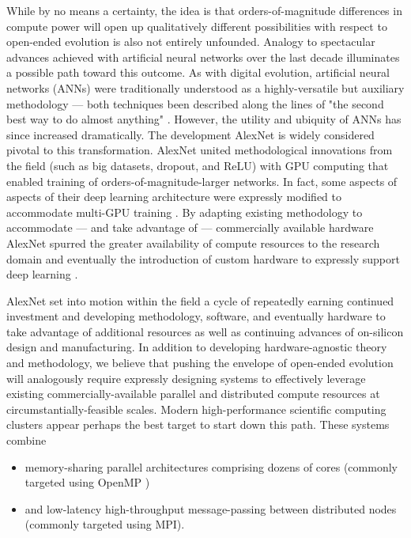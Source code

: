 While by no means a certainty, the idea is that orders-of-magnitude differences in compute power will open up qualitatively different possibilities with respect to open-ended evolution is also not entirely unfounded.
Analogy to spectacular advances achieved with artificial neural networks over the last decade illuminates a possible path toward this outcome.
As with digital evolution, artificial neural networks (ANNs) were traditionally understood as a highly-versatile but auxiliary methodology --- both techniques been described along the lines of "the second best way to do almost anything" \citep{miaoulis2008intelligent, eiben2015introduction}.
However, the utility and ubiquity of ANNs has since increased dramatically.
The development AlexNet is widely considered pivotal to this transformation.
AlexNet united methodological innovations from the field (such as big datasets, dropout, and ReLU) with GPU computing that enabled training of orders-of-magnitude-larger networks.
In fact, some aspects of aspects of their deep learning architecture were expressly modified to accommodate multi-GPU training \citep{krizhevsky2012imagenet}.
By adapting existing methodology to accommodate --- and take advantage of --- commercially available hardware AlexNet spurred the greater availability of compute resources to the research domain and eventually the introduction of custom hardware to expressly support deep learning \citep{jouppi2017datacenter}.

AlexNet set into motion within the field a cycle of repeatedly earning continued investment and developing methodology, software, and eventually hardware to take advantage of additional resources as well as continuing advances of on-silicon design and manufacturing.
In addition to developing hardware-agnostic theory and methodology, we believe that pushing the envelope of open-ended evolution will analogously require expressly designing systems to effectively leverage existing commercially-available parallel and distributed compute resources at circumstantially-feasible scales.
Modern high-performance scientific computing clusters appear perhaps the best target to start down this path.
These systems combine
\begin{itemize}
\item memory-sharing parallel architectures comprising dozens of cores (commonly targeted using OpenMP \citep{dagum1998openmp})
\item and low-latency high-throughput message-passing between distributed nodes (commonly targeted using MPI\citep{clarke1994mpi}).
\end{itemize}

